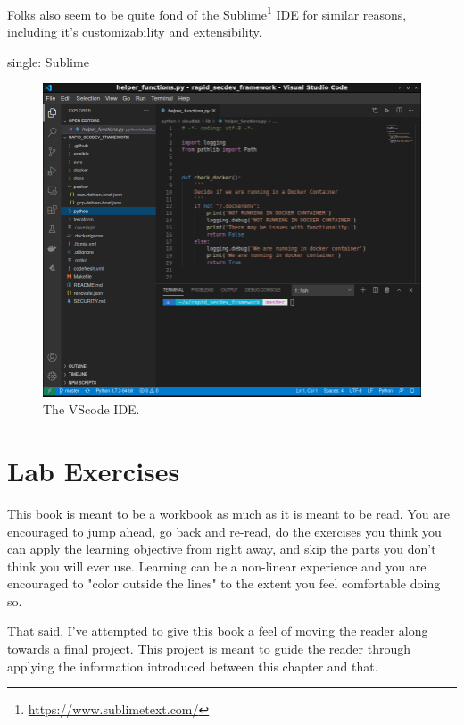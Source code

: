 \justify
Folks also seem to be quite fond of the Sublime\footnote{\url{https://www.sublimetext.com/}} IDE for similar reasons, including it's customizability and extensibility.

single: Sublime

\begin{figure}
\centering
\includegraphics[scale=0.45]{../images/setup-vscode.png}
\caption{The VScode IDE.}
\end{figure}

\section{Lab Exercises}
\justify
This book is meant to be a workbook as much as it is meant to be read. You are encouraged to jump ahead, go back and re-read, do the exercises you think you can apply the learning objective from right away, and skip the parts you don't think you will ever use. Learning can be a non-linear experience and you are encouraged to "color outside the lines" to the extent you feel comfortable doing so.

\justify
That said, I've attempted to give this book a feel of moving the reader along towards a final project. This project is meant to guide the reader through applying the information introduced between this chapter and that.
